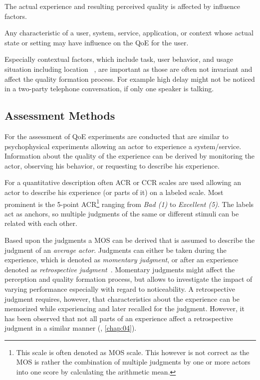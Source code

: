 The actual experience and resulting perceived quality is affected by influence factors.
\begin{definition}
Any characteristic of a user, system, service, application, or context whose actual state or setting may have influence on the \ac{QoE} for the user.~\citep[][p.~56]{reiter_quality_2014}
\end{definition}
Especially contextual factors, which include task, user behavior, and usage situation including location ~\citep[\cf,][p.~56]{reiter_quality_2014}, are important as those are often not invariant and affect the quality formation process.
For example high delay might not be noticed in a two-party telephone conversation, if only one speaker is talking.

\subsection{Assessment Methods}
For the assessment of \ac{QoE} experiments are conducted that are similar to psychophysical experiments allowing an actor to experience a system/service.
Information about the quality of the experience can be derived by monitoring the actor, observing his behavior, or requesting to describe his experience.

For a quantitative description often \ac{ACR} or \ac{CCR} scales are used allowing an actor to describe his experience (or parts of it) on a labeled scale.
Most prominent is the 5-point \ac{ACR}\footnote{This scale is often denoted as \ac{MOS} scale. This however is not correct as the \ac{MOS} is rather the combination of multiple judgments by one or more actors into one score by calculating the arithmetic mean.} ranging from \emph{Bad (1)} to \emph{Excellent (5)}.
The labels act as anchors, so multiple judgments of the same or different stimuli can be related with each other.

Based upon the judgments a \ac{MOS} can be derived that is assumed to describe the judgment of an \emph{average actor}.
Judgments can either be taken during the experience, which is denoted as \emph{momentary judgment}, or after an experience denoted as \emph{retrospective judgment}~\citep[\cf,][]{weiss_temporal_2014}.
Momentary judgments might affect the perception and quality formation process, but allows to investigate the impact of varying performance especially with regard to noticeability.
A retrospective judgment requires, however, that characteristics about the experience can be memorized while experiencing and later recalled for the judgment.
However, it has been observed that not all parts of an experience affect a retrospective judgment in a similar manner (\cf, \autoref{chap:04}).

